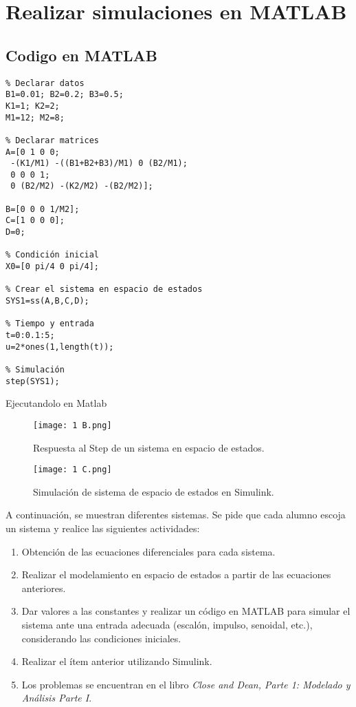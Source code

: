 \documentclass{report}
\begin{document}
\section{Realizar simulaciones en MATLAB }
\subsection{Codigo en MATLAB }
\begin{verbatim}
% Declarar datos
B1=0.01; B2=0.2; B3=0.5; 
K1=1; K2=2;
M1=12; M2=8;

% Declarar matrices
A=[0 1 0 0;
 -(K1/M1) -((B1+B2+B3)/M1) 0 (B2/M1);
 0 0 0 1;
 0 (B2/M2) -(K2/M2) -(B2/M2)];

B=[0 0 0 1/M2];
C=[1 0 0 0];
D=0;

% Condición inicial
X0=[0 pi/4 0 pi/4];

% Crear el sistema en espacio de estados
SYS1=ss(A,B,C,D);

% Tiempo y entrada
t=0:0.1:5;
u=2*ones(1,length(t));

% Simulación
step(SYS1);
\end{verbatim}
Ejecutandolo en Matlab
\begin{figure}[H]
    \centering
    \texttt{[image: 1 B.png]}
    \caption{Respuesta al Step de un sistema en espacio de estados.}
    \label{fig:diagrama_modelo}
\end{figure}

\begin{figure}[H]
    \centering
    \texttt{[image: 1 C.png]}
    \caption{Simulación de sistema de espacio de estados en Simulink.}
    \label{fig:diagrama_modelo}
\end{figure}
A continuación, se muestran diferentes sistemas. Se pide que cada alumno escoja un sistema y realice las siguientes actividades:

\begin{enumerate}
    \item Obtención de las ecuaciones diferenciales para cada sistema.
    \item Realizar el modelamiento en espacio de estados a partir de las ecuaciones anteriores.
    \item Dar valores a las constantes y realizar un código en MATLAB para simular el sistema ante una entrada adecuada (escalón, impulso, senoidal, etc.), considerando las condiciones iniciales.
    \item Realizar el ítem anterior utilizando Simulink.
    \item Los problemas se encuentran en el libro \textit{Close and Dean, Parte 1: Modelado y Análisis Parte I}.
\end{enumerate}
\end{document}
